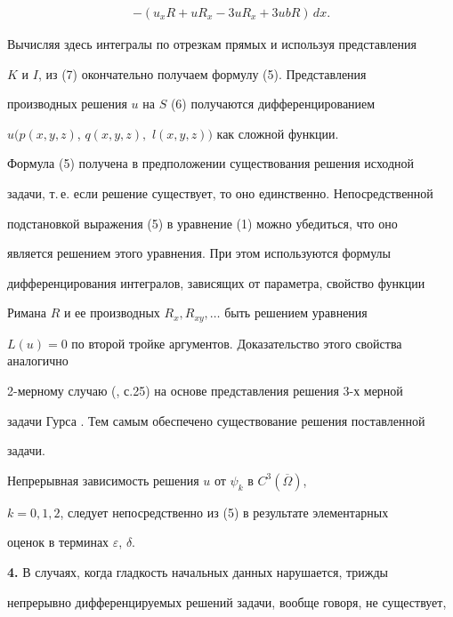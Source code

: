 \begin{pf}
\begin{gather*}
-(u_{x}R+uR_{x}-3uR_{x}+3ubR)\, dx.


\end{gather*}





Вычисляя здесь  интегралы по отрезкам прямых и используя представления


$K$ и $I$, из (7) окончательно получаем формулу (5). Представления


производных решения $u$ на $S$ (6) получаются дифференцированием


$u(p(x,y,z)$, $q(x,y,z),$ $l(x,y,z))$ как сложной функции.





Формула (5) получена в предположении существования решения исходной


задачи, т.\,е. если решение существует, то оно единственно. Непосредственной


под\-ста\-нов\-кой выражения (5) в уравнение (1) можно  убедиться,  что  оно


является решением этого уравнения. При этом используются формулы


дифференцирования интегралов, зависящих от параметра, свойство функции


Римана $R$ и ее производных $R_{x},R_{xy},\dotsc$ быть решением уравнения


$L(u)=0$ по второй тройке аргументов. Доказательство этого свойства аналогично


2-мерному случаю (\cite{Vek}, с.25) на основе представления решения 3-х мерной


задачи Гурса \cite{Zhe}. Тем самым обеспечено существование решения поставленной


задачи.





Непрерывная зависимость решения $u$ от $\psi_{k}$ в $C^3(\overline{\Omega} )$,


$k=0,1,2$, следует непосредственно из (5) в результате элементарных


оценок в терминах $\varepsilon$, $\delta$.


\end{pf}





{\bf 4.} В случаях, когда гладкость начальных данных нарушается, трижды


непрерывно дифференцируемых решений задачи, вообще говоря, не существует,



